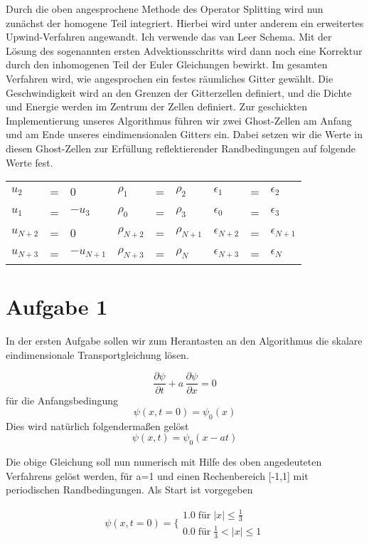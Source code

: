 \documentclass[12pt]{article}
\begin{document}
Durch die oben angesprochene Methode des Operator Splitting wird nun zunächst der homogene Teil integriert. Hierbei wird unter anderem ein erweitertes Upwind-Verfahren angewandt. Ich verwende das van Leer Schema. Mit der Lösung des sogenannten ersten Advektionsschritts wird dann noch eine Korrektur durch den inhomogenen Teil der Euler Gleichungen bewirkt. Im gesamten Verfahren wird, wie angesprochen ein festes räumliches Gitter gewählt. Die Geschwindigkeit wird an den Grenzen der Gitterzellen definiert, und die Dichte und Energie werden im Zentrum der Zellen definiert. Zur geschickten Implementierung unseres Algorithmus führen wir zwei Ghost-Zellen am Anfang und am Ende unseres eindimensionalen Gitters ein. Dabei setzen wir die Werte in diesen Ghost-Zellen zur Erfüllung reflektierender Randbedingungen auf folgende Werte fest.

\begin{table}[H]\begin{tabular}{l c l l c l l c l}
$u_2$&=&0&$\rho_1$&=&$\rho_2$&$\epsilon_1$&=&$\epsilon_2$\\
$u_1$&=&$-u_3$&$\rho_0$&=&$\rho_3$&$\epsilon_0$&=&$\epsilon_3$\\
$u_{N+2}$&=&0&$\rho_{N+2}$&=&$\rho_{N+1}$&$\epsilon_{N+2}$&=&$\epsilon_{N+1}$\\
$u_{N+3}$&=&$-u_{N+1}$&$\rho_{N+3}$&=&$\rho_N$&$\epsilon_{N+3}$&=&$\epsilon_N$
\end{tabular}\end{table}

\section{Aufgabe 1}
In der ersten Aufgabe sollen wir zum Herantasten an den Algorithmus die skalare eindimensionale Transportgleichung lösen. 

\begin{equation*}\frac{\partial\psi}{\partial{t}}+a\,\frac{\partial\psi}{\partial{x}}=0\end{equation*}
für die Anfangsbedingung
\begin{equation*}\psi(x,t=0)=\psi_0(x)\end{equation*}
Dies wird natürlich folgendermaßen gelöst
$$\psi(x,t)=\psi_0(x-at)$$

Die obige Gleichung soll nun numerisch mit Hilfe des oben angedeuteten Verfahrens gelöst werden, für a=1 und einen Rechenbereich [-1,1] mit periodischen Randbedingungen. Als Start ist vorgegeben

\begin{equation*}\psi(x,t=0)=\biggl\{\begin{array}{l}1.0\;\text{für}\;|x|\leq\frac{1}{3}\\
0.0\;\text{für}\;\frac{1}{3}<|x|\leq{1}\end{array}\end{equation*}
\end{document}
